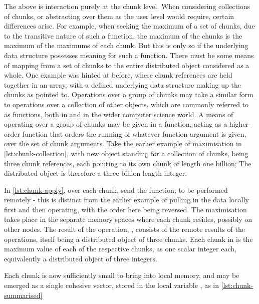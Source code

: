 The above is interaction purely at the chunk level.
When considering collections of chunks, or abstracting over them as the user level would require, certain differences arise.
For example, when seeking the maximum of a set of chunks, due to the transitive nature of such a function, the maximum of the chunks is the maximum of the maximums of each chunk.
But this is only so if the underlying data structure possesses meaning for such a function.
There must be some means of mapping from a set of chunks to the entire distributed object considered as a whole.
One example was hinted at before, where chunk references are held together in an array, with a defined underlying data structure making up the chunks as pointed to.
Operations over a group of chunks may take a similar form to operations over a collection of other objects, which are commonly referred to as  functions, both in \R{} and in the wider computer science world.
A means of operating over a group of chunks may be given in a  function, acting as a higher-order function that orders the running of whatever function argument is given, over the set of chunk arguments.
Take the earlier example of maximisation in \cref{lst:chunk-collection}, with new object  standing for a collection of chunks, being three chunk references, each pointing to its own chunk of length one billion; The distributed object is therefore a three billion length integer.


In \cref{lst:chunk-apply}, over each chunk, send the  function, to be performed remotely - this is distinct from the earlier example of pulling in the data locally first and then operating, with the order here being reversed.
The maximisation takes place in the separate memory spaces where each chunk resides, possibly on other nodes.
The result of the operation, , consists of the remote results of the operations, itself being a distributed object of three chunks.
Each chunk in  is the maximum value of each of the respective  chunks, as one scalar integer each, equivalently a distributed object of three integers.


Each chunk is now sufficiently small to bring into local memory, and may be emerged as a single cohesive vector, stored in the local variable , as in \cref{lst:chunk-summarised}

